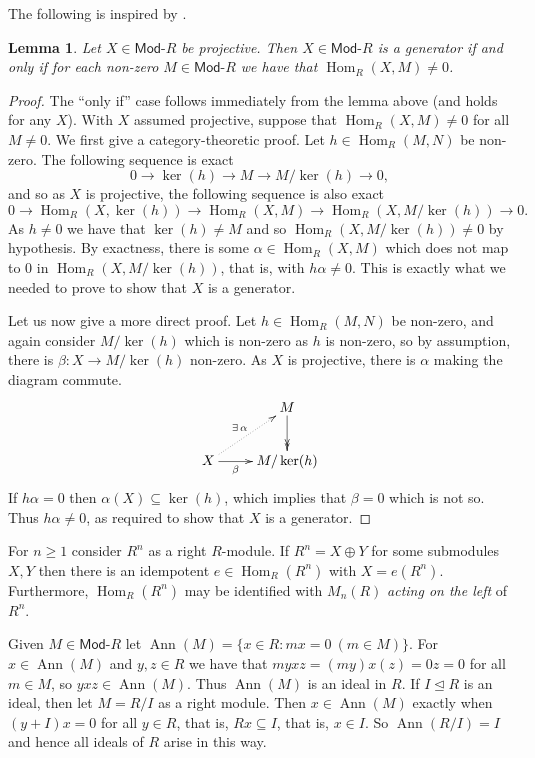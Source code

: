 \documentclass[a4paper,12pt]{article}
\theoremstyle{plain}
\newtheorem{lemma}[proposition]{Lemma}
\theoremstyle{definition}
\renewcommand{\mod}{\textsf{Mod-}}
\renewcommand{\hom}{\operatorname{Hom}}
\newcommand{\ann}{\operatorname{Ann}}
\begin{document}
The following is inspired by \cite{qy1}.

\begin{lemma}
Let $X\in\mod R$ be projective.  Then
$X\in\mod R$ is a generator if and only if for each non-zero $M\in\mod R$ we have that $\hom_R(X,M)\not=0$.
\end{lemma}
\begin{proof}
The ``only if'' case follows immediately from the lemma above (and holds for any $X$).  With $X$ assumed
projective, suppose that $\hom_R(X,M)\not=0$ for all $M\not=0$.  We first give a category-theoretic proof.
Let $h\in\hom_R(M,N)$ be non-zero.  The following sequence is exact
\[ 0 \rightarrow \ker(h) \rightarrow M \rightarrow M/\ker(h) \rightarrow 0, \]
and so as $X$ is projective, the following sequence is also exact
\[ 0 \rightarrow \hom_R(X,\ker(h)) \rightarrow \hom_R(X,M) \rightarrow \hom_R(X,M/\ker(h))
\rightarrow 0. \]
As $h\not=0$ we have that $\ker(h)\not= M$ and so $\hom_R(X,M/\ker(h)) \not =0$ by hypothesis.
By exactness, there is some $\alpha\in \hom_R(X,M)$ which does not map to $0$ in $\hom_R(X,M/\ker(h))$,
that is, with $h\alpha\not=0$.  This is exactly what we needed to prove to show that $X$ is a generator.

Let us now give a more direct proof.  Let $h\in\hom_R(M,N)$ be non-zero, and again consider $M/\ker(h)$ which is non-zero as $h$ is non-zero, so by assumption, there is $\beta:X\rightarrow M/\ker(h)$ non-zero.  As
$X$ is projective, there is $\alpha$ making the diagram commute.
\[ \xymatrix{ &  M \ar@{->>}[d] \\
X \ar@{..>}[ru]^{\exists\, \alpha} \ar[r]_-\beta &
M/\ker(h) } \]
If $h\alpha=0$ then $\alpha(X)\subseteq\ker(h)$, which implies that $\beta=0$ which is not so.  Thus
$h\alpha\not=0$, as required to show that $X$ is a generator.
\end{proof}

For $n\geq 1$ consider $R^n$ as a right $R$-module.  If $R^n = X\oplus Y$ for some submodules $X,Y$ then
there is an idempotent $e\in \hom_R(R^n)$ with $X = e(R^n)$.  Furthermore, $\hom_R(R^n)$ may be identified
with $M_n(R)$ \emph{acting on the left} of $R^n$.

Given $M\in\mod R$ let $\ann(M) = \{ x\in R : mx=0 \ (m\in M) \}$.  For $x\in\ann(M)$ and $y,z\in R$ we
have that $myxz = (my)x(z) = 0z = 0$ for all $m\in M$, so $yxz\in\ann(M)$.  Thus $\ann(M)$ is an ideal in $R$.
If $I \trianglelefteq R$ is an ideal, then let $M = R/I$ as a right module.  Then $x\in\ann(M)$ exactly
when $(y+I)x = 0$ for all $y\in R$, that is, $Rx \subseteq I$, that is, $x\in I$.  So $\ann(R/I) = I$ and
hence all ideals of $R$ arise in this way.
\end{document}
